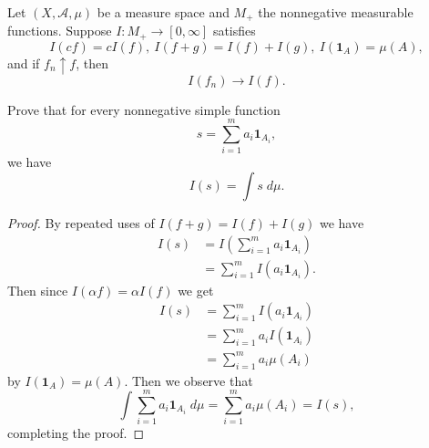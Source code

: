 \begin{prob}
    Let $(X,\mathcal A, \mu)$ be a measure space and 
    $M_+$ the nonnegative measurable functions. 
    Suppose $I : M_+ \to [0,\infty]$ satisfies 
    \[
        I(cf) = cI(f), \ I(f+g) = I(f) + I(g), 
        \ I(\textbf{1}_A) = \mu(A),
    \]
    and if $f_n \uparrow f$, then 
    \[
        I(f_n) \to I(f).
    \]

    Prove that for every nonnegative simple function 
    \[
        s = \sum_{i=1}^m a_i \textbf{1}_{A_i},
    \]
    we have 
    \[
        I(s) = \int s \; d\mu.
    \]
\end{prob}
\begin{proof}
    By repeated uses of $I(f + g) = I(f) + I(g)$ we have 
    \begin{align*}
        I(s) 
        &= 
        I\left(\sum_{i=1}^m a_i \textbf{1}_{A_i}\right) \\      
        &= \sum_{i=1}^m I(a_i \textbf{1}_{A_i}).
    \end{align*}
    Then since $I(\alpha f) = \alpha I(f)$ we get 
    \begin{align*}
        I (s) &= \sum_{i=1}^m I(a_i \textbf{1}_{A_i}) \\
        &= \sum_{i=1}^m a_i I(\textbf{1}_{A_i}) \\ 
        &= \sum_{i=1}^m a_i \mu(A_i)
    \end{align*}
    by $I(\textbf{1}_A) = \mu(A)$.
    Then we observe that 
    \[
        \int \sum_{i=1}^m a_i \textbf{1}_{A_i} \; d\mu 
        = \sum_{i=1}^m a_i \mu(A_i) 
        = I(s),
    \]
    completing the proof.
\end{proof}

